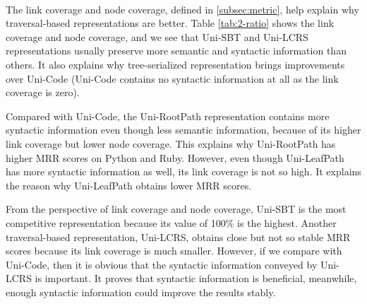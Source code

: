 \documentclass[conference]{IEEEtran}
\begin{document}
\begin{table}[thb]
\centering
\caption{Coverage Ratios of Unimodal Representations}
~\\
\label{tab:2-ratio}
\end{table}
 
The link coverage and node coverage, defined in \autoref{subsec:metric}, help explain why traversal-based representations are better. Table \ref{tab:2-ratio} shows the link coverage and node coverage, and we see that Uni-SBT and Uni-LCRS representations usually preserve more semantic and syntactic information than others. It also explains why tree-serialized representation brings improvements over Uni-Code (Uni-Code contains no syntactic information at all as the link coverage is zero).

Compared with Uni-Code, the Uni-RootPath representation contains more syntactic information even though less semantic information, because of its higher link coverage but lower node coverage. This explains why Uni-RootPath has higher MRR scores on Python and Ruby. However, even though Uni-LeafPath has more syntactic information as well, its link coverage is not so high. It explains the reason why Uni-LeafPath obtains lower MRR scores.

From the perspective of link coverage and node coverage, Uni-SBT is the most competitive representation because its value of 100\% is the highest. Another traversal-based representation, Uni-LCRS, obtains close but not so stable MRR scores because its link coverage is much smaller. However, if we compare with Uni-Code, then it is obvious that the syntactic information conveyed by Uni-LCRS is important. It proves that syntactic information is beneficial, meanwhile, enough syntactic information could improve the results stably.
\end{document}
